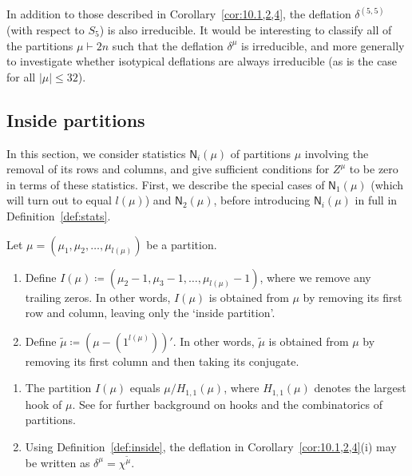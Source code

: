 \documentclass[ALCO, Unicode]{cedram}
\newcommand{\sn}{\mathsf{N}}
\begin{document}
In addition to those described in Corollary~\ref{cor:10.1,2,4}, the deflation $\delta^{(5,5)}$ (with respect to $S_5$) is also irreducible. It would be interesting to classify all of the partitions $\mu\vdash 2n$ such that the deflation $\delta^\mu$ is irreducible, and more generally to investigate whether isotypical deflations are always irreducible (as is the case for all $|\mu|\le 32$).



\subsection{Inside partitions}\label{sec:inside-partition}
In this section, we consider statistics $\sn_i(\mu)$ of partitions $\mu$ involving the removal of its rows and columns, and give sufficient conditions for $Z^\mu$ to be zero in terms of these statistics. First, we describe the special cases of $\sn_1(\mu)$ (which will turn out to equal $l(\mu)$) and $\sn_2(\mu)$, before introducing $\sn_i(\mu)$ in full in Definition~\ref{def:stats}.

\begin{definition}\label{def:inside}
	Let $\mu=(\mu_1,\mu_2,\dotsc,\mu_{l(\mu)})$ be a partition.
	\begin{enumerate}[label=\textup{(\roman*)}]
		\item\label{641} Define $I(\mu)\coloneqq (\mu_2-1,\mu_3-1,\dotsc,\mu_{l(\mu)}-1)$, where we remove any trailing zeros. In other words, $I(\mu)$ is obtained from $\mu$ by removing its first row and column, leaving only the `inside partition'.
		
		\item\label{642} Define $\tilde{\mu}\coloneqq  (\mu-(1^{l(\mu)}))'$. In other words, $\tilde{\mu}$ is obtained from $\mu$ by removing its first column and then taking its conjugate.
	\end{enumerate}
\end{definition}

\begin{remark}
	\begin{enumerate}[label=\textup{(\roman*)}]
		\item The partition $I(\mu)$ equals $\mu/H_{1,1}(\mu)$, where $H_{1,1}(\mu)$ denotes the largest hook of $\mu$. See \cite{JK,Olsson} for further background on hooks and the combinatorics of partitions.
		\item Using Definition~\ref{def:inside}, the deflation in Corollary~\ref{cor:10.1,2,4}(i) may be written as $\delta^\mu = \chi^{\tilde{\mu}}$. %
	\end{enumerate}
\end{remark}
\end{document}
